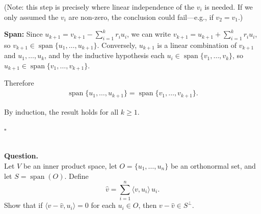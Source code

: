 \documentclass{article}
\begin{document}
\begin{mdframed}[linewidth=1pt]
(Note: this step is precisely where linear independence of the $v_i$ is needed. If we only assumed the $v_i$ are non-zero, the conclusion could fail---e.g., if $v_2 = v_1$.)

\textbf{Span:} Since $u_{k+1} = v_{k+1} - \sum_{i=1}^{k} r_i u_i$, we can write $v_{k+1} = u_{k+1} + \sum_{i=1}^{k} r_i u_i$, so $v_{k+1} \in \operatorname{span}\{u_1, \dots, u_{k+1}\}$. Conversely, $u_{k+1}$ is a linear combination of $v_{k+1}$ and $u_1, \dots, u_k$, and by the inductive hypothesis each $u_i \in \operatorname{span}\{v_1, \dots, v_k\}$, so $u_{k+1} \in \operatorname{span}\{v_1, \dots, v_{k+1}\}$.

Therefore
\begin{align*}
\operatorname{span}\{u_1, \dots, u_{k+1}\} = \operatorname{span}\{v_1, \dots, v_{k+1}\}.
\end{align*}

By induction, the result holds for all $k \ge 1$.

\hfill $\square$
\end{mdframed}

\bigskip

\hfill \break  $~\!\!$ \dotfill \medskip \\
\textbf{Question.}\\
Let $V$ be an inner product space, let $O = \{u_1, \dots, u_n\}$ be an orthonormal set, and let $S = \operatorname{span}(O)$. Define
\[
\hat{v} = \sum_{i=1}^{n} \langle v, u_i \rangle\, u_i.
\]
Show that if $\langle v - \hat{v}, u_i \rangle = 0$ for each $u_i \in O$, then $v - \hat{v} \in S^\perp$.
\end{document}
